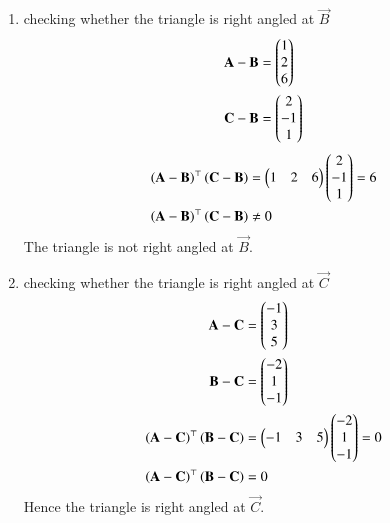 \documentclass[journal,12pt,twocolumn]{IEEEtran}
\begin{document}
\begin{enumerate}
\begin{enumerate}
\item checking whether the triangle is right angled at $\vec{B}$
\begin{align}
\mathbf{A}-\mathbf{B} &= \begin{pmatrix}1\\2\\6\end{pmatrix} \\
\mathbf{C}-\mathbf{B} &= \begin{pmatrix}2\\-1\\1\end{pmatrix} 
\end{align}
\begin{align}
\left(\mathbf{A}-\mathbf{B}\right)^{\top}\left(\mathbf{C}-\mathbf{B}\right) &= \begin{pmatrix}1&2&6\end{pmatrix}\begin{pmatrix}2\\-1\\1\end{pmatrix} = 6\\
\left(\mathbf{A}-\mathbf{B}\right)^{\top}\left(\mathbf{C}-\mathbf{B}\right) &\neq 0
\end{align}
The triangle is not right angled at $\vec{B}$.\\

\item checking whether the triangle is right angled at $\vec{C}$
\begin{align}
\mathbf{A}-\mathbf{C} &= \begin{pmatrix}-1\\3\\5\end{pmatrix} \\
\mathbf{B}-\mathbf{C} &= \begin{pmatrix}-2\\1\\-1\end{pmatrix} \\
\left(\mathbf{A}-\mathbf{C}\right)^{\top}\left(\mathbf{B}-\mathbf{C}\right) &= \begin{pmatrix}-1&3&5\end{pmatrix}\begin{pmatrix}-2\\1\\-1\end{pmatrix} = 0\\
\left(\mathbf{A}-\mathbf{C}\right)^{\top}\left(\mathbf{B}-\mathbf{C}\right) &= 0
\end{align}
Hence the triangle is right angled at $\vec{C}$.
\end{enumerate}
\end{enumerate}
\end{document}
